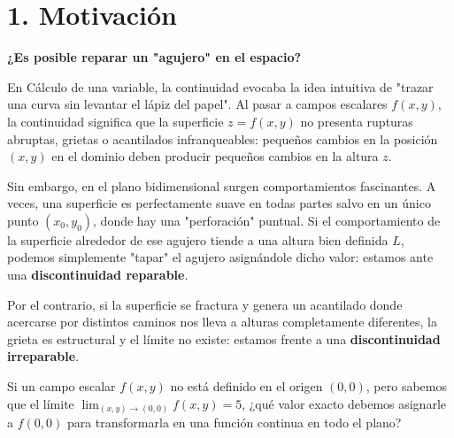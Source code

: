 \documentclass[11pt]{article}
\newenvironment{motivacion}{%
  \section*{1. Motivación}%
}{}
\newenvironment{preguntaguia}{%
  \begin{tcolorbox}[colback=cyan!5,colframe=cyan!75!black,title=Pregunta Guía]%
}{%
  \end{tcolorbox}%
}
\begin{document}
\begin{motivacion}
  \textbf{¿Es posible reparar un "agujero" en el espacio?}

  En Cálculo de una variable, la continuidad evocaba la idea intuitiva de "trazar una curva sin levantar el lápiz del papel". Al pasar a campos escalares $f(x,y)$, la continuidad significa que la superficie $z = f(x,y)$ no presenta rupturas abruptas, grietas o acantilados infranqueables: pequeños cambios en la posición $(x,y)$ en el dominio deben producir pequeños cambios en la altura $z$.

  Sin embargo, en el plano bidimensional surgen comportamientos fascinantes. A veces, una superficie es perfectamente suave en todas partes salvo en un único punto $(x_0, y_0)$, donde hay una "perforación" puntual. Si el comportamiento de la superficie alrededor de ese agujero tiende a una altura bien definida $L$, podemos simplemente "tapar" el agujero asignándole dicho valor: estamos ante una \textbf{discontinuidad reparable}.

  Por el contrario, si la superficie se fractura y genera un acantilado donde acercarse por distintos caminos nos lleva a alturas completamente diferentes, la grieta es estructural y el límite no existe: estamos frente a una \textbf{discontinuidad irreparable}.

  \begin{preguntaguia}
    Si un campo escalar $f(x,y)$ no está definido en el origen $(0,0)$, pero sabemos que el límite $\displaystyle \lim_{(x,y)\to(0,0)} f(x,y) = 5$, ¿qué valor exacto debemos asignarle a $f(0,0)$ para transformarla en una función continua en todo el plano?
  \end{preguntaguia}
\end{motivacion}
\end{document}
